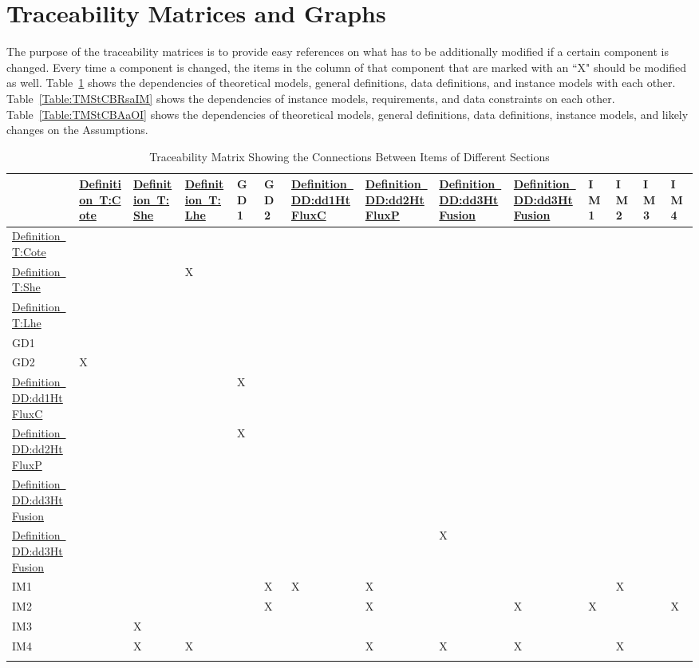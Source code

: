 \documentclass[12pt]{article}
\begin{document}
\section{Traceability Matrices and Graphs}
\label{Sec:TMaG}
The purpose of the traceability matrices is to provide easy references on what has to be additionally modified if a certain component is changed. Every time a component is changed, the items in the column of that component that are marked with an ``X" should be modified as well. Table~\ref{Table:TMStCBIoDS} shows the dependencies of theoretical models, general definitions, data definitions, and instance models with each other. Table~\ref{Table:TMStCBRsaIM} shows the dependencies of instance models, requirements, and data constraints on each other. Table~\ref{Table:TMStCBAaOI} shows the dependencies of theoretical models, general definitions, data definitions, instance models, and likely changes on the Assumptions.
\begin{longtable}{l l l l l l l l l l l l l l}
\toprule
 & \hyperref[T:Cote]{Definition~T:Cote} & \hyperref[T:She]{Definition~T:She} & \hyperref[T:Lhe]{Definition~T:Lhe} & GD1 & GD2 & \hyperref[DD:dd1HtFluxC]{Definition~DD:dd1HtFluxC} & \hyperref[DD:dd2HtFluxP]{Definition~DD:dd2HtFluxP} & \hyperref[DD:dd3HtFusion]{Definition~DD:dd3HtFusion} & \hyperref[DD:dd3HtFusion]{Definition~DD:dd3HtFusion} & IM1 & IM2 & IM3 & IM4
\\
\midrule
\hyperref[T:Cote]{Definition~T:Cote} &  &  &  &  &  &  &  &  &  &  &  &  & 
\\
\hyperref[T:She]{Definition~T:She} &  &  & X &  &  &  &  &  &  &  &  &  & 
\\
\hyperref[T:Lhe]{Definition~T:Lhe} &  &  &  &  &  &  &  &  &  &  &  &  & 
\\
GD1 &  &  &  &  &  &  &  &  &  &  &  &  & 
\\
GD2 & X &  &  &  &  &  &  &  &  &  &  &  & 
\\
\hyperref[DD:dd1HtFluxC]{Definition~DD:dd1HtFluxC} &  &  &  & X &  &  &  &  &  &  &  &  & 
\\
\hyperref[DD:dd2HtFluxP]{Definition~DD:dd2HtFluxP} &  &  &  & X &  &  &  &  &  &  &  &  & 
\\
\hyperref[DD:dd3HtFusion]{Definition~DD:dd3HtFusion} &  &  &  &  &  &  &  &  &  &  &  &  & 
\\
\hyperref[DD:dd3HtFusion]{Definition~DD:dd3HtFusion} &  &  &  &  &  &  &  & X &  &  &  &  & 
\\
IM1 &  &  &  &  & X & X & X &  &  &  & X &  & 
\\
IM2 &  &  &  &  & X &  & X &  & X & X &  &  & X
\\
IM3 &  & X &  &  &  &  &  &  &  &  &  &  & 
\\
IM4 &  & X & X &  &  &  & X & X & X &  & X &  & 
\\
\bottomrule
\caption{Traceability Matrix Showing the Connections Between Items of Different Sections}
\label{Table:TMStCBIoDS}
\end{longtable}
\end{document}
